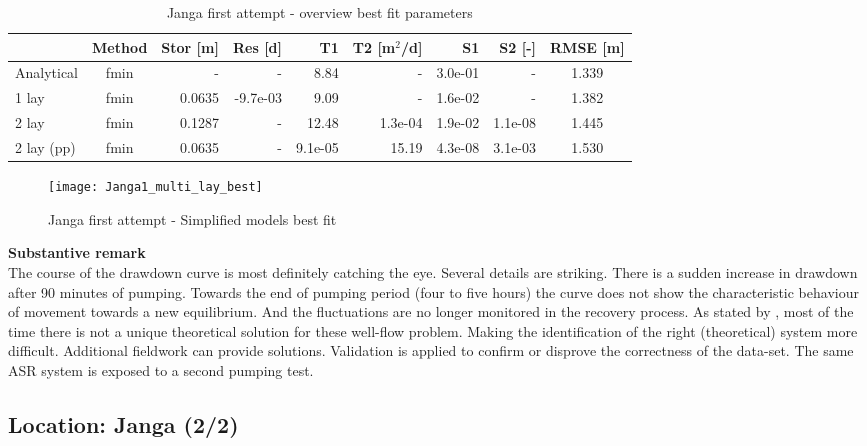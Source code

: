 \begin{table}[h!]
\small
\centering
\caption{Janga first attempt - overview best fit parameters}
\label{tab:Janga1_table}
\begin{tabular}{l|c|r|r|rr|rr|c}
\hline 
\textbf{}       & \textbf{Method} & \textbf{Stor [m]} & \textbf{Res [d]} & \textbf{T1}  & \textbf{T2   [m$^2$/d]}  & \textbf{S1}  & \textbf{S2 [-]}  & \textbf{RMSE [m]} \\ \hline \hline
Analytical                & fmin             & -             & -            & 8.84       & -          & 3.0e-01    & -          & 1.339 \\
1 lay                     & fmin             & 0.0635        & -9.7e-03     & 9.09       & -          & 1.6e-02    & -          & 1.382 \\
2 lay                     & fmin             & 0.1287        & -            & 12.48      & 1.3e-04    & 1.9e-02    & 1.1e-08    & 1.445 \\
2 lay (pp)                & fmin             & 0.0635        & -            & 9.1e-05    & 15.19      & 4.3e-08    & 3.1e-03    & 1.530 \\ \hline    
\end{tabular}
\end{table}

\begin{figure}[h!]
 \centering
 \texttt{[image: Janga1\_multi\_lay\_best]}
 \captionsetup{justification=centering} 
 \caption{Janga first attempt - Simplified models best fit}
 \label{fig:Janga1_best}
\end{figure}

\textbf{Substantive remark} \\
The course of the drawdown curve is most definitely catching the eye. Several details are striking. There is a sudden increase in drawdown after 90 minutes of pumping. Towards the end of pumping period (four to five hours) the curve does not show the characteristic behaviour of movement towards a new equilibrium. And the fluctuations are no longer monitored in the recovery process. As stated by \citet{Kruseman2000}, most of the time there is not a unique theoretical solution for these well-flow problem. Making the identification of the right (theoretical) system more difficult. Additional fieldwork can provide solutions. Validation is applied to confirm or disprove the correctness of the data-set. The same ASR system is exposed to a second pumping test.

\subsection{Location: Janga (2/2)}

